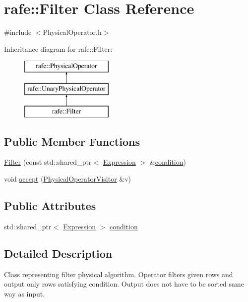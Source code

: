 \hypertarget{classrafe_1_1_filter}{\section{rafe\+:\+:Filter Class Reference}
\label{classrafe_1_1_filter}
}


{\ttfamily \#include $<$Physical\+Operator.\+h$>$}

Inheritance diagram for rafe\+:\+:Filter\+:\begin{figure}[H]
\begin{center}
\leavevmode
\includegraphics[height=3.000000cm]{classrafe_1_1_filter}
\end{center}
\end{figure}
\subsection*{Public Member Functions}
\begin{DoxyCompactItemize}
\item 
\hyperlink{classrafe_1_1_filter_af4f33192eef0626cf16fc9cb51b3e3de}{Filter} (const std\+::shared\+\_\+ptr$<$ \hyperlink{classrafe_1_1_expression}{Expression} $>$ \&\hyperlink{classrafe_1_1_filter_ac57844e611bd2d1951d1d4089135ddb9}{condition})
\item 
void \hyperlink{classrafe_1_1_filter_a27d15fd98afe3c03f05f5a4c5846b2a6}{accept} (\hyperlink{classrafe_1_1_physical_operator_visitor}{Physical\+Operator\+Visitor} \&v)
\end{DoxyCompactItemize}
\subsection*{Public Attributes}
\begin{DoxyCompactItemize}
\item 
std\+::shared\+\_\+ptr$<$ \hyperlink{classrafe_1_1_expression}{Expression} $>$ \hyperlink{classrafe_1_1_filter_ac57844e611bd2d1951d1d4089135ddb9}{condition}
\end{DoxyCompactItemize}


\subsection{Detailed Description}
Class representing filter physical algorithm. Operator filters given rows and output only rows satisfying condition. Output does not have to be sorted same way as input. 

